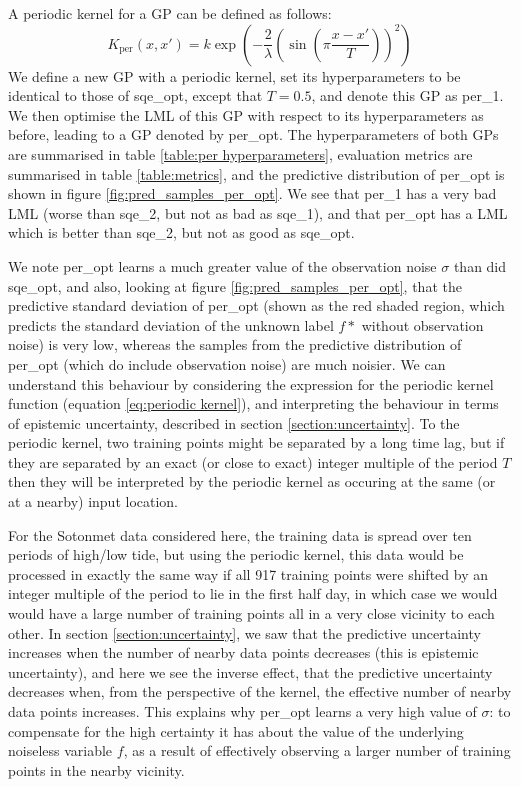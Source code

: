A periodic kernel for a GP can be defined as follows:
\begin{equation}
    K_\text{per}(x, x') = k \exp\left( -\frac{2}{\lambda} \left( \sin \left( \pi \frac{x-x'}{T} \right) \right)^2 \right) \label{eq:periodic kernel}
\end{equation}
We define a new GP with a periodic kernel, set its hyperparameters to be identical to those of sqe\_opt, except that $T=0.5$, and denote this GP as per\_1. We then optimise the LML of this GP with respect to its hyperparameters as before, leading to a GP denoted by per\_opt. The hyperparameters of both GPs are summarised in table \ref{table:per hyperparameters}, evaluation metrics are summarised in table \ref{table:metrics}, and the predictive distribution of per\_opt is shown in figure \ref{fig:pred_samples_per_opt}. We see that per\_1 has a very bad LML (worse than sqe\_2, but not as bad as sqe\_1), and that per\_opt has a LML which is better than sqe\_2, but not as good as sqe\_opt.

We note per\_opt learns a much greater value of the observation noise $\sigma$ than did sqe\_opt, and also, looking at figure \ref{fig:pred_samples_per_opt}, that the predictive standard deviation of per\_opt (shown as the red shaded region, which predicts the standard deviation of the unknown label $f*$ without observation noise) is very low, whereas the samples from the predictive distribution of per\_opt (which do include observation noise) are much noisier. We can understand this behaviour by considering the expression for the periodic kernel function (equation \ref{eq:periodic kernel}), and interpreting the behaviour in terms of epistemic uncertainty, described in section \ref{section:uncertainty}. To the periodic kernel, two training points might be separated by a long time lag, but if they are separated by an exact (or close to exact) integer multiple of the period $T$ then they will be interpreted by the periodic kernel as occuring at the same (or at a nearby) input location.

For the Sotonmet data considered here, the training data is spread over ten periods of high/low tide, but using the periodic kernel, this data would be processed in exactly the same way if all 917 training points were shifted by an integer multiple of the period to lie in the first half day, in which case we would would have a large number of training points all in a very close vicinity to each other. In section \ref{section:uncertainty}, we saw that the predictive uncertainty increases when the number of nearby data points decreases (this is epistemic uncertainty), and here we see the inverse effect, that the predictive uncertainty decreases when, from the perspective of the kernel, the effective number of nearby data points increases. This explains why per\_opt learns a very high value of $\sigma$: to compensate for the high certainty it has about the value of the underlying noiseless variable $f$, as a result of effectively observing a larger number of training points in the nearby vicinity.

